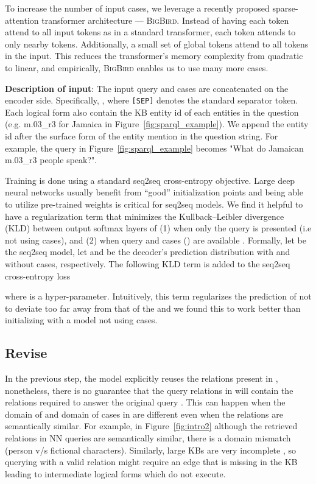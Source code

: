 \documentclass[11pt]{article}
\newcommand{\bigb}{\textsc{BigBird}\xspace}
\begin{document}
To increase the number of input cases, we leverage a recently proposed sparse-attention transformer architecture --- \bigb \cite{zaheer2020big}. Instead of having each token attend to all input tokens as in a standard transformer, each token attends to only nearby tokens. Additionally, a small set of global tokens attend to all tokens in the input. This reduces the transformer's memory complexity from quadratic to linear, and empirically, \bigb enables us to use many more cases.

\textbf{Description of input}: The input query  and cases  are concatenated on the encoder side. Specifically, , where \texttt{[SEP]} denotes the standard separator token. Each logical form also contain the KB entity id of each entities in the question (e.g. m.03\_r3 for Jamaica in Figure~\ref{fig:sparql_example}). We append the entity id after the surface form of the entity mention in the question string. For example, the query in Figure~\ref{fig:sparql_example} becomes "What do Jamaican m.03\_r3 people speak?".


Training is done using a standard seq2seq cross-entropy objective. Large deep neural networks usually benefit from ``good'' initialization points \citep{frankle2019lottery} and being able to utilize pre-trained weights is critical for seq2seq models. We find it helpful to have a regularization term that minimizes the Kullback–Leibler divergence (KLD) between output softmax layers of (1) when only the query  is presented (i.e not using cases), and (2) when query and cases () are available \cite{yu2013kl}.
Formally, let  be the seq2seq model, let  and  be the decoder's prediction distribution with and without cases, respectively. The following KLD term is added to the seq2seq cross-entropy loss

 where  is a hyper-parameter. Intuitively, this term regularizes the prediction of  not to deviate too far away from that of the  and we found this to work better than initializing with a model not using cases.



\subsection{Revise}
\label{sub:revise}

In the previous step, the model explicitly reuses the relations present in , nonetheless, there is no guarantee that the query relations in  will contain the relations required to answer the original query . 
This can happen when the domain of  and domain of cases in  are different even when  the relations are semantically similar.  For example, in Figure~\ref{fig:intro2} although the retrieved relations in NN queries are semantically similar, there is a domain mismatch (person v/s fictional characters). Similarly, large KBs are very incomplete \cite{min2013distant}, so querying with a valid relation might require an edge that is missing in the KB leading to intermediate logical forms which do not execute.
\end{document}
